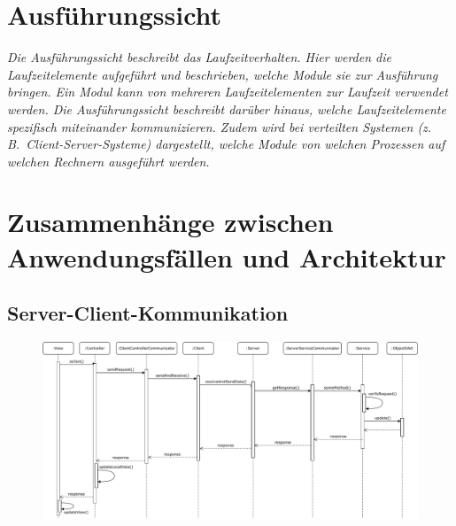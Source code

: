\documentclass[fontsize=12pt,paper=a4,twoside]{scrartcl}
\begin{document}
\section{Ausführungssicht} \label{sec:ausfuehrung}

{\itshape Die Ausführungssicht beschreibt das Laufzeitverhalten. Hier werden die
Laufzeitelemente aufgeführt und beschrieben, welche Module sie zur Ausführung 
bringen. Ein Modul kann von mehreren Laufzeitelementen zur Laufzeit verwendet 
werden. Die Ausführungssicht beschreibt darüber hinaus, welche Laufzeitelemente 
spezifisch miteinander kommunizieren. Zudem wird bei verteilten Systemen 
(z.\,B.\ Client-Server-Systeme) dargestellt, welche Module von welchen Prozessen
auf welchen Rechnern ausgeführt werden.}


\section{Zusammenhänge zwischen Anwendungsfällen und Architektur}
 \label{sec:anwendungsfaelle}

\subsection{Server-Client-Kommunikation}

\begin{figure}[H]
\begin{center}
  \includegraphics[width=\linewidth]{UML/Server_client_Sequenzdiagramm.pdf}
\end{center}
\end{figure}
\end{document}
